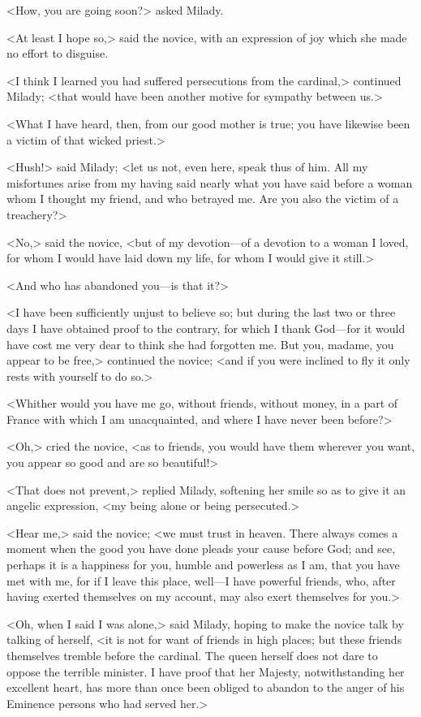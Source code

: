 <How, you are going soon?> asked Milady. 

<At least I hope so,> said the novice, with an expression of joy which she made no effort to disguise. 

<I think I learned you had suffered persecutions from the cardinal,> continued Milady; <that would have been another motive for sympathy between us.> 

<What I have heard, then, from our good mother is true; you have likewise been a victim of that wicked priest.> 

<Hush!> said Milady; <let us not, even here, speak thus of him. All my misfortunes arise from my having said nearly what you have said before a woman whom I thought my friend, and who betrayed me. Are you also the victim of a treachery?> 

<No,> said the novice, <but of my devotion—of a devotion to a woman I loved, for whom I would have laid down my life, for whom I would give it still.> 

<And who has abandoned you—is that it?> 

<I have been sufficiently unjust to believe so; but during the last two or three days I have obtained proof to the contrary, for which I thank God—for it would have cost me very dear to think she had forgotten me. But you, madame, you appear to be free,> continued the novice; <and if you were inclined to fly it only rests with yourself to do so.> 

<Whither would you have me go, without friends, without money, in a part of France with which I am unacquainted, and where I have never been before?> 

<Oh,> cried the novice, <as to friends, you would have them wherever you want, you appear so good and are so beautiful!> 

<That does not prevent,> replied Milady, softening her smile so as to give it an angelic expression, <my being alone or being persecuted.> 

<Hear me,> said the novice; <we must trust in heaven. There always comes a moment when the good you have done pleads your cause before God; and see, perhaps it is a happiness for you, humble and powerless as I am, that you have met with me, for if I leave this place, well—I have powerful friends, who, after having exerted themselves on my account, may also exert themselves for you.> 

<Oh, when I said I was alone,> said Milady, hoping to make the novice talk by talking of herself, <it is not for want of friends in high places; but these friends themselves tremble before the cardinal. The queen herself does not dare to oppose the terrible minister. I have proof that her Majesty, notwithstanding her excellent heart, has more than once been obliged to abandon to the anger of his Eminence persons who had served her.> 

